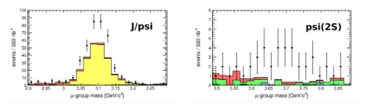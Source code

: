 \documentclass[compress]{beamer}
\begin{document}
\begin{frame}
\begin{columns}
\includegraphics[width=\linewidth]{Mu9_mass_jpsi.png}

\includegraphics[width=\linewidth]{Mu9_mass_psi2s.png}

\end{columns}
\end{frame}
\end{document}
